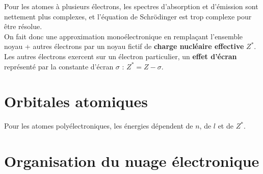 \documentclass[13pt, twoside, a4paper, french, tikz]{report}
\begin{document}
    Pour les atomes à plusieurs électrons, les spectres d'absorption et d'émission sont nettement plus complexes, et l'équation de Schrödinger est trop complexe pour être résolue.\\
    
    On fait donc une approximation monoélectronique en remplaçant l'ensemble {noyau + autres électrons} par un noyau fictif de \textbf{charge nucléaire effective} $Z^*$.\\
    Les autres électrons exercent sur un électron particulier, un \textbf{effet d'écran} représenté par la constante d'écran $\sigma$ : $Z^* = Z - \sigma$.
  
  
  \section{Orbitales atomiques}\label{sec:orbitales-atomiques}
    
    Pour les atomes polyélectroniques, les énergies dépendent de $n$, de $l$ et de $Z^*$.
  
  
  \section{Organisation du nuage électronique}\label{sec:organisation-du-nuage-electronique}
    
\end{document}
